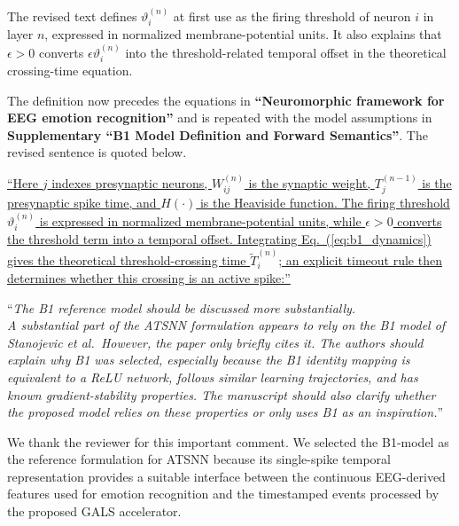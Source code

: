 \documentclass[12pt,technote,onecolumn]{IEEEtran}
\begin{document}
The revised text defines \(\vartheta_i^{(n)}\) at first use as the
firing threshold of neuron \(i\) in layer \(n\), expressed in normalized
membrane-potential units. It also explains that \(\epsilon>0\) converts
\(\epsilon\vartheta_i^{(n)}\) into the threshold-related temporal offset
in the theoretical crossing-time equation.



The definition now precedes the equations in \textbf{``Neuromorphic framework for EEG emotion recognition''} and is repeated with the model assumptions in \textbf{Supplementary ``B1 Model Definition and Forward Semantics''}. The revised sentence is quoted below.

\uline{``Here $j$ indexes presynaptic neurons, $W_{ij}^{(n)}$ is the synaptic weight, $T_j^{(n-1)}$ is the presynaptic spike time, and $H(\cdot)$ is the Heaviside function. The firing threshold $\vartheta_i^{(n)}$ is expressed in normalized membrane-potential units, while $\epsilon>0$ converts the threshold term into a temporal offset. Integrating Eq.~(\ref{eq:b1_dynamics}) gives the theoretical threshold-crossing time $\tilde{T}_i^{(n)}$; an explicit timeout rule then determines whether this crossing is an active spike:''}

\vspace{4mm}

``{\it The B1 reference model should be discussed more substantially.\\
A substantial part of the ATSNN formulation appears to rely on the B1
model of Stanojevic et al.~However, the paper only briefly cites it. The
authors should explain why B1 was selected, especially because the B1
identity mapping is equivalent to a ReLU network, follows similar
learning trajectories, and has known gradient-stability properties. The
manuscript should also clarify whether the proposed model relies on
these properties or only uses B1 as an inspiration.}''
\vspace{1mm}


We thank the reviewer for this important comment. We selected the
B1-model as the reference formulation for ATSNN because its single-spike
temporal representation provides a suitable interface between the
continuous EEG-derived features used for emotion recognition and the
timestamped events processed by the proposed GALS accelerator.
\end{document}
